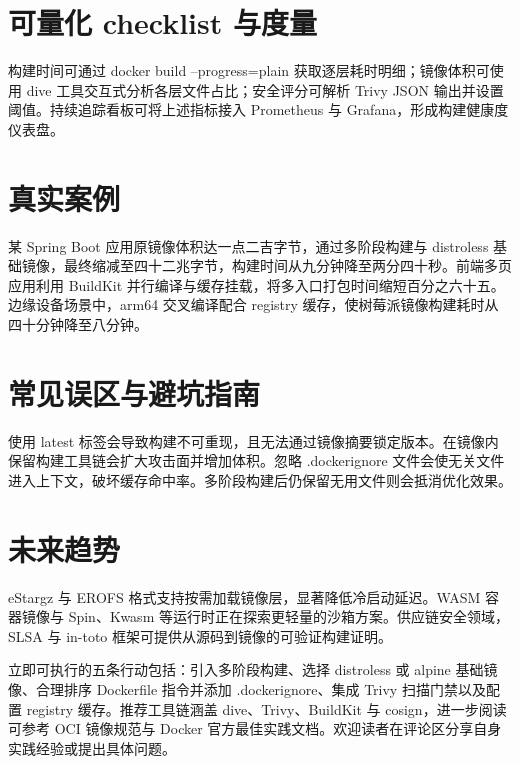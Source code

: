 \chapter{可量化 checklist 与度量}
构建时间可通过 docker build --progress=plain 获取逐层耗时明细；镜像体积可使用 dive 工具交互式分析各层文件占比；安全评分可解析 Trivy JSON 输出并设置阈值。持续追踪看板可将上述指标接入 Prometheus 与 Grafana，形成构建健康度仪表盘。\par
\chapter{真实案例}
某 Spring Boot 应用原镜像体积达一点二吉字节，通过多阶段构建与 distroless 基础镜像，最终缩减至四十二兆字节，构建时间从九分钟降至两分四十秒。前端多页应用利用 BuildKit 并行编译与缓存挂载，将多入口打包时间缩短百分之六十五。边缘设备场景中，arm64 交叉编译配合 registry 缓存，使树莓派镜像构建耗时从四十分钟降至八分钟。\par
\chapter{常见误区与避坑指南}
使用 latest 标签会导致构建不可重现，且无法通过镜像摘要锁定版本。在镜像内保留构建工具链会扩大攻击面并增加体积。忽略 .dockerignore 文件会使无关文件进入上下文，破坏缓存命中率。多阶段构建后仍保留无用文件则会抵消优化效果。\par
\chapter{未来趋势}
eStargz 与 EROFS 格式支持按需加载镜像层，显著降低冷启动延迟。WASM 容器镜像与 Spin、Kwasm 等运行时正在探索更轻量的沙箱方案。供应链安全领域，SLSA 与 in-toto 框架可提供从源码到镜像的可验证构建证明。\par
立即可执行的五条行动包括：引入多阶段构建、选择 distroless 或 alpine 基础镜像、合理排序 Dockerfile 指令并添加 .dockerignore、集成 Trivy 扫描门禁以及配置 registry 缓存。推荐工具链涵盖 dive、Trivy、BuildKit 与 cosign，进一步阅读可参考 OCI 镜像规范与 Docker 官方最佳实践文档。欢迎读者在评论区分享自身实践经验或提出具体问题。\par
